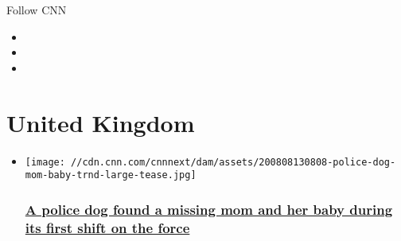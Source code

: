 Follow CNN

\begin{itemize}
\item
\item
\item
\end{itemize}

\hypertarget{united-kingdom}{%
\section{United Kingdom}\label{united-kingdom}}

\begin{itemize}
\item
  \href{/2020/08/08/uk/police-dog-mom-baby-trnd/index.html}{}

  \texttt{[image: //cdn.cnn.com/cnnnext/dam/assets/200808130808-police-dog-mom-baby-trnd-large-tease.jpg]}

  \hypertarget{a-police-dog-found-a-missing-mom-and-her-baby-during-its-first-shift-on-the-force}{%
  \subsubsection{\texorpdfstring{\href{/2020/08/08/uk/police-dog-mom-baby-trnd/index.html}{A
  police dog found a missing mom and her baby during its first shift on
  the
  force}}{A police dog found a missing mom and her baby during its first shift on the force}}\label{a-police-dog-found-a-missing-mom-and-her-baby-during-its-first-shift-on-the-force}}
\end{itemize}

